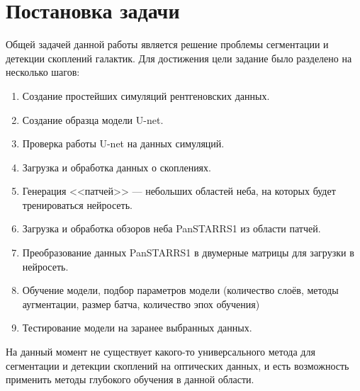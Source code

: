 \chapter{Постановка задачи}
\label{cha:ch_1}

Общей задачей данной работы является решение проблемы сегментации и детекции скоплений галактик. Для 
достижения цели задание было разделено на несколько шагов:

\begin{enumerate}
    \item Создание простейших симуляций рентгеновских данных.
    \item Создание образца модели U-net.
    \item Проверка работы U-net на данных симуляций.
    \item Загрузка и обработка данных о скоплениях.
    \item Генерация <<патчей>> --- небольших областей неба, на которых будет тренироваться нейросеть.
    \item Загрузка и обработка обзоров неба PanSTARRS1 из области патчей.
    \item Преобразование данных PanSTARRS1 в двумерные матрицы для загрузки в нейросеть.
    \item Обучение модели, подбор параметров модели (количество слоёв, методы аугментации, размер 
        батча, количество эпох обучения)
    \item Тестирование модели на заранее выбранных данных.
\end{enumerate}

На данный момент не существует какого-то универсального метода для сегментации и детекции скоплений 
на оптических данных, и есть возможность применить методы глубокого обучения в данной области.\\
